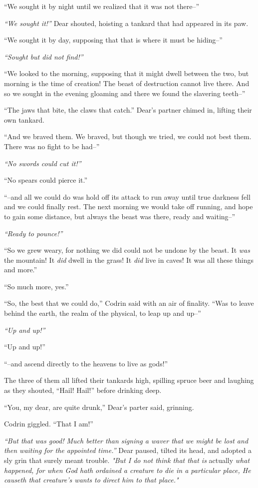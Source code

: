 ``We sought it by night until we realized that it was not there--''

\emph{``We sought it!''} Dear shouted, hoisting a tankard that had appeared in its paw.

``We sought it by day, supposing that that is where it must be hiding--''

\emph{``Sought but did not find!''}

``We looked to the morning, supposing that it might dwell between the two, but morning is the time of creation! The beast of destruction cannot live there. And so we sought in the evening gloaming and there we found the slavering teeth--''

``The jaws that bite, the claws that catch.'' Dear's partner chimed in, lifting their own tankard.

``And we braved them. We braved, but though we tried, we could not best them. There was no fight to be had--''

\emph{``No swords could cut it!''}

``No spears could pierce it.''

``--and all we could do was hold off its attack to run away until true darkness fell and we could finally rest. The next morning we would take off running, and hope to gain some distance, but always the beast was there, ready and waiting--''

\emph{``Ready to pounce!''}

``So we grew weary, for nothing we did could not be undone by the beast. It \emph{was} the mountain! It \emph{did} dwell in the grass! It \emph{did} live in caves! It was all these things and more.''

``So much more, yes.''

``So, the best that we could do,'' Codrin said with an air of finality. ``Was to leave behind the earth, the realm of the physical, to leap up and up--''

\emph{``Up and up!''}

``Up and up!''

``--and ascend directly to the heavens to live as gods!''

The three of them all lifted their tankards high, spilling spruce beer and laughing as they shouted, ``Hail! Hail!'' before drinking deep.

``You, my dear, are quite drunk,'' Dear's parter said, grinning.

Codrin giggled. ``That I am!''

\emph{``But that was good! Much better than signing a waver that we might be lost and then waiting for the appointed time.''} Dear paused, tilted its head, and adopted a sly grin that surely meant trouble. \emph{"But I do not think that that is} actually \emph{what happened, for when God hath ordained a creature to die in a particular place, He causeth that creature's wants to direct him to that place."}

